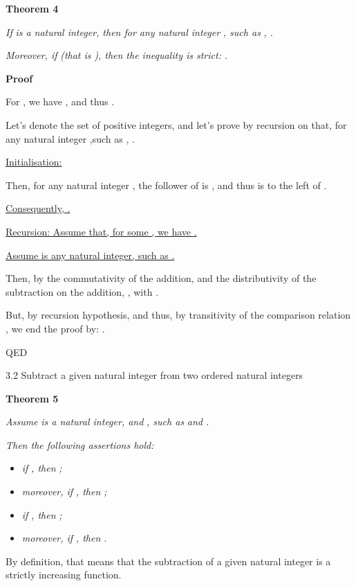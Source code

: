 \documentclass{article}
\providecommand{\tightlist}{%
  \setlength{\itemsep}{0pt}\setlength{\parskip}{0pt}}
\begin{document}
\textbf{Theorem 4}

\emph{If }\emph{ is a natural integer, then for any natural integer }\emph{, such as }\emph{, }\emph{.}

\emph{Moreover, if }\emph{ (that is }\emph{), then the inequality is strict: }\emph{.}

\textbf{Proof}

For , we have , and thus .

Let’s denote  the set of positive integers, and let’s prove by recursion on  that, for any natural integer ,such as , .

\ul{Initialisation}\ul{: }

Then, for any natural integer , the follower of  is , and thus  is to the left of .

\ul{Consequently, }\ul{.}

\ul{Recursion}\ul{: Assume that, for some }\ul{, we have }\ul{.}

\ul{Assume }\ul{ is any natural integer, such as }\ul{.}

Then, by the commutativity of the addition, and the distributivity of the subtraction on the addition, , with .

But, by recursion hypothesis,  and thus, by transitivity of the comparison relation , we end the proof by: .

QED



3.2 Subtract a given natural integer from two ordered natural integers

\textbf{Theorem 5}

\emph{Assume }\emph{ is a natural integer, and }\emph{, such as }\emph{ and }\emph{. }

\emph{Then the following assertions hold:}

\begin{itemize}
\tightlist
\item \emph{if }\emph{, then }\emph{;}
\end{itemize}

\begin{itemize}
\tightlist
\item \emph{moreover, if }\emph{, then }\emph{;}
\item \emph{if }\emph{, then }\emph{;}
\item \emph{moreover, if }\emph{, then }\emph{.}
\end{itemize}

By definition, that means that the subtraction of a given natural integer is a strictly increasing function.
\end{document}
